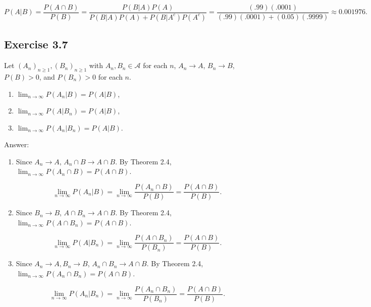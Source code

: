 \documentclass{article}
\begin{document}
$$
P(A \vert B) = \frac{P(A \cap B)}{P(B)}
= \frac{P(B \vert A)P(A)}{P(B \vert A)P(A) + P(B \vert A^c) P(A^c)}
= \frac{(.99)(.0001)}{(.99)(.0001) + (0.05)(.9999)} \approx 0.001976.
$$

\subsection*{Exercise 3.7}

Let $(A_n)_{n\geq 1}, (B_n)_{n\geq 1}$ with $A_n, B_n \in \mathcal{A}$ for each $n$, $A_n \rightarrow A$, $B_n \rightarrow B$, $P(B) > 0$, and $P(B_n) > 0$ for each $n$.

\begin{enumerate}
\item $\lim_{n \rightarrow \infty} P(A_n \vert B) = P(A \vert B)$,

\item $\lim_{n \rightarrow \infty} P(A \vert B_n) = P(A \vert B)$,

\item $\lim_{n \rightarrow \infty} P(A_n \vert B_n) = P(A \vert B)$.

\end{enumerate}

Answer: 

\begin{enumerate}
\item Since $A_n \rightarrow A$, $A_n \cap B \rightarrow A \cap B$. By Theorem 2.4, $\lim_{n\rightarrow \infty} P(A_n \cap B) = P(A\cap B)$.

$$
\lim_{n\rightarrow \infty} P(A_n \vert B) = \lim_{n\rightarrow \infty} \frac{P(A_n \cap B)}{P(B)} = \frac{P(A \cap B)}{P(B)}.
$$

\item Since $B_n \rightarrow B$, $A \cap B_n \rightarrow A \cap B$. By Theorem 2.4, $\lim_{n\rightarrow \infty} P(A \cap B_n) = P(A\cap B)$.

$$
\lim_{n\rightarrow \infty} P(A \vert B_n) = \lim_{n\rightarrow \infty} \frac{P(A \cap B_n)}{P(B_n)} = \frac{P(A \cap B)}{P(B)}.
$$

\item Since $A_n \rightarrow A, B_n \rightarrow B$, $A_n \cap B _n\rightarrow A \cap B$. By Theorem 2.4, $\lim_{n\rightarrow \infty} P(A_n \cap B_n) = P(A\cap B)$.

$$
\lim_{n\rightarrow \infty} P(A_n \vert B_n) = \lim_{n\rightarrow \infty} \frac{P(A_n \cap B_n)}{P(B_n)} = \frac{P(A \cap B)}{P(B)}.
$$
\end{enumerate}
\end{document}
